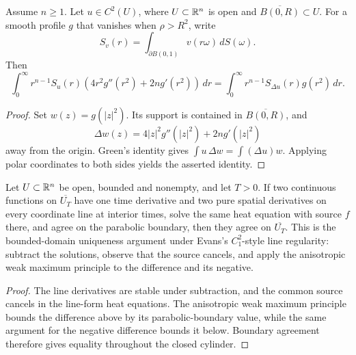 \begin{lemma}
\label{lem:sourced-weak-radial-ode-identity}


Assume $n\geq 1$. Let $u\in C^2(U)$, where $U\subset\mathbb{R}^n$ is open and
$\overline{B(0,R)}\subset U$. For a smooth profile $g$ that vanishes when
$\rho>R^2$, write
\[
S_v(r)=\int_{\partial B(0,1)}v(r\omega)\,dS(\omega).
\]
Then
\[
\int_0^\infty r^{n-1}S_u(r)
  \left(4r^2g''(r^2)+2n g'(r^2)\right)\,dr
=\int_0^\infty r^{n-1}S_{\Delta u}(r)g(r^2)\,dr.
\]
\end{lemma}
\begin{proof}

Set $w(z)=g(|z|^2)$. Its support is contained in
$\overline{B(0,R)}$, and
\[
\Delta w(z)=4|z|^2g''(|z|^2)+2n g'(|z|^2)
\]
away from the origin. Green's identity gives
$\int u\,\Delta w=\int (\Delta u)w$. Applying polar coordinates to both
sides yields the asserted identity.
\end{proof}

\begin{lemma}
\label{lem:uniqueness-heat-bounded-domain-anisotropic}


Let $U \subset \mathbb{R}^n$ be open, bounded and nonempty, and let $T>0$. If two
continuous functions on $\overline{U_T}$ have one time derivative and two pure
spatial derivatives on every coordinate line at interior times, solve the same
heat equation with source $f$ there, and agree on the parabolic boundary, then
they agree on $\overline{U_T}$. This is the bounded-domain uniqueness argument
under Evans's $C^2_1$-style line regularity: subtract the solutions, observe
that the source cancels, and apply the anisotropic weak maximum principle to the
difference and its negative.
\end{lemma}
\begin{proof}

The line derivatives are stable under subtraction, and the common source cancels
in the line-form heat equations. The anisotropic weak maximum principle bounds
the difference above by its parabolic-boundary value, while the same argument
for the negative difference bounds it below. Boundary agreement therefore gives
equality throughout the closed cylinder.
\end{proof}

